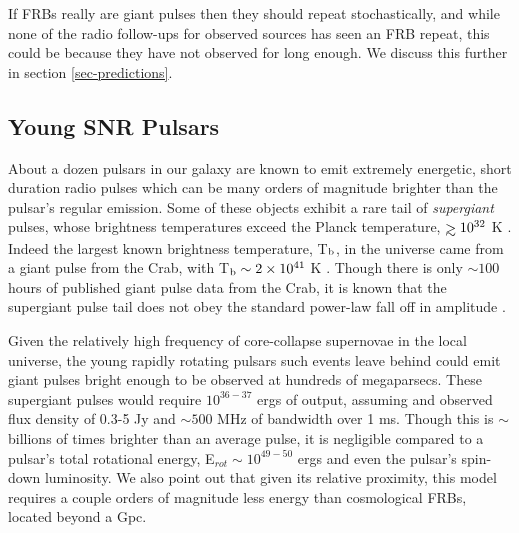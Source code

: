 \documentclass[useAMS,usenatbib]{mn2e}
\def\gtrsim{\mathrel{\hbox{\rlap{\hbox{\lower4pt\hbox{$\sim$}}}\hbox{$>$}}}}
\begin{document}
If FRBs really are giant pulses then they 
should repeat stochastically, and while none of the radio follow-ups for
observed sources has seen an FRB repeat, this could be because they
have not observed for long enough. We discuss this further in section 
\ref{sec-predictions}.

\subsection{Young SNR Pulsars}

About a dozen pulsars in our galaxy are known to emit extremely energetic,
short duration radio pulses which can be many orders of magnitude 
brighter than the pulsar's regular emission. Some of these objects exhibit 
a rare tail of \textit{supergiant} pulses, whose brightness temperatures 
exceed the Planck temperature, $\gtrsim10^{32}$ K \citep{2004ApJ...612..375C}.
Indeed the largest
known brightness temperature, T$_{\rm b}$, in the universe came from a giant pulse from the Crab,
 with T$_{\rm b}\sim2\times10^{41}$ K \citep{2014ApJ...792..135T}. Though there
is only $\sim100$ hours of published giant pulse data from the Crab, it is known
that the supergiant pulse tail does not obey the standard power-law fall off
in amplitude \citep{2012ApJ...760...64M}.

Given the relatively high frequency of core-collapse supernovae 
in the local universe, the young 
rapidly rotating pulsars such events leave behind could emit giant 
pulses bright enough to be observed at hundreds of megaparsecs. 
These supergiant pulses would require $10^{36 - 37}$ ergs of output,
assuming and observed flux density of 0.3-5 Jy and $\sim500$ 
MHz of bandwidth over 1 ms. Though this is $\sim$ billions of times
brighter than an average pulse, it is negligible compared to a 
pulsar's total rotational energy, E$_{rot} \sim 10^{49-50}$ ergs and
even the pulsar's spin-down luminosity. We
also point out that given its relative proximity, this model requires
a couple orders of magnitude less energy than cosmological FRBs,
located beyond a Gpc. 

\end{document}
